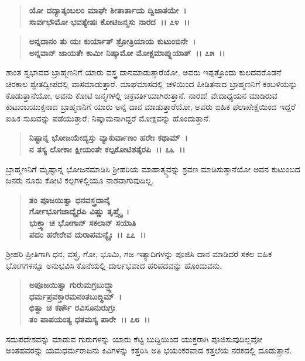 \begin{verse}
\textbf{ಯೋ ದದ್ಯಾತ್ಕಂಬಲಂ ಮಾಘೇ ಶೀತಾರ್ತಾಯ ದ್ವಿಜಾತಯೇ~।}\\\textbf{ಸಾರ್ವಭೌಮೋ ಭವತ್ಯೇಷಃ ಕೋಟಿಜನ್ಮಸು ನಾರದ~।। ೭೪~।।} 
\end{verse}

\begin{verse}
\textbf{ಅನ್ನದಾನಂ ತು ಯಃ ಕುರ್ಯಾತ್ ಶ್ರೋತ್ರಿಯಾಯ ಕುಟುಂಬಿನೇ~।}\\\textbf{ಅನ್ನವಾನ್ ಜಾಯತೇ ಕಾಮೀ ನಿಷ್ಕಾಮೋ ಮೋಕ್ಷಮಾಪ್ನುಯಾತ್~।। ೭೫~।।}
\end{verse}

ಶಾಂತ ಸ್ವಭಾವದ ಬ್ರಾಹ್ಮಣನಿಗೆ ಯಾರು ವಸ್ತ್ರ ದಾನಮಾಡುತ್ತಾರೆಯೋ, ಅವರು ಇಪ್ಪತ್ತೊಂದು ಕುಲದವರೊಡನೆ ಚಿರಕಾಲ ಶ್ವೇತದ್ವೀಪದಲ್ಲಿ ವಾಸಮಾಡುತ್ತಾರೆ. ಮಾಘಮಾಸದಲ್ಲಿ ಚಳಿಯಿಂದ ಪೀಡಿತನಾದ ಬ್ರಾಹ್ಮಣನಿಗೆ ಕಂಬಳಿಯನ್ನು ಕೊಡುತ್ತಾನೆಯೋ, ಅವನು ಕೋಟಿ ಜನ್ಮಗಳಲ್ಲಿ ಚಕ್ರವರ್ತಿಯಾಗಿರುತ್ತಾನೆ. ನಾರದ! ವೇದಾಧ್ಯಯನ ಮಾಡಿರುವ ಕುಟುಂಬಯುಕ್ತನಾದ ಬ್ರಾಹ್ಮಣನಿಗೆ ಯಾರು ಅನ್ನ ದಾನ ಮಾಡುತ್ತಾರೆಯೋ, ಅವರು ಐಹಿಕ ಫಲಾಪೇಕ್ಷೆಯಿಂದ ಇದ್ದರೆ ಐಹಿಕ ಸುಖವನ್ನು ಪಡೆಯುತ್ತಾರೆ; ನಿಷ್ಕಾಮನಾಗಿದ್ದರೆ ಮೋಕ್ಷವನ್ನು ಹೊಂದುತ್ತಾನೆ.

\begin{verse}
\textbf{ನಿಷ್ಟಾನ್ನ ಭೋಜಯೇದ್ಯಸ್ತು ವ್ಯಾಕುರ್ವಾಣಂ ಹರೇಃ ಕಥಾಮ್~।}\\\textbf{ನ ತಸ್ಯ ಲೋಕಾಃ ಕ್ಷೀಯಂತೇ ಕಲ್ಪಕೋಟಿಶತೈರಪಿ~।। ೭೬~।।}
\end{verse}

ಬ್ರಾಹ್ಮಣನಿಗೆ ಮೃಷ್ಟಾನ್ನ ಭೋಜನಮಾಡಿಸಿ ಶ‍್ರೀಹರಿಯ ಮಾಹಾತ್ಮ್ಯವನ್ನು ಶ್ರವಣ ಮಾಡಿಸುತ್ತಾನೆಯೋ ಅವನ ಕುಟುಂಬದ ಜನರು ನೂರು ಕೋಟಿ ಕಲ್ಪಗಳಲ್ಲಿಯೂ ನಾಶವಾಗುವುದಿಲ್ಲ.

\begin{verse}
\textbf{ತಂ ಪೂಜಯಿತ್ವಾ ಧನವಸ್ತ್ರದಾನೈ\enginline{-}}\\\textbf{ರ್ಗೋಭೂಗಜಾದ್ಯೈರಪಿ ವಿಷ್ಣು ತೃಪ್ತ್ಯೈ~। }\\\textbf{ಭುಕ್ತ್ವಾ ಚ ಭೋಗಾನ್ ಸಕಲಾನ್ ಸಯಾತಿ} \\\textbf{ಪದಂ ಹರೇರೇವ ದುರಾಪಮನ್ಯೈಃ~।। ೭೭~।।}
\end{verse}

ಶ‍್ರೀಹರಿ ಪ್ರೀತಿಗಾಗಿ ಧನ, ವಸ್ತ್ರ, ಗೋ, ಭೂಮಿ, ಗಜ ಇತ್ಯಾದಿಗಳನ್ನು ಪೂಜಿಸಿ ದಾನ ಮಾಡಿದರೆ ಸಕಲ ಐಹಿಕ ಭೋಗಗಳನ್ನೂ ಅನುಭವಿಸಿ ಕೊನೆಯಲ್ಲಿ ದುರ್ಲಭವಾದ ಹರಿಪದವನ್ನು ಹೊಂದುವನು.

\begin{verse}
\textbf{ಅಪೂಜಯಿತ್ವಾ ಗುರುಮಗ್ರಬುದ್ಧ್ಯಾ}\\\textbf{ಧರ್ಮಪ್ರವಕ್ತಾರಮನಂತಬುದ್ಧಿಮ್~।}\\\textbf{ಛಿತ್ವಾ ಚ ಕರ್ಣೌ ರವಿಸೂನುರುಗ್ರಃ} \\\textbf{ತಂ ಪಾಪಯಂತ್ಯ ಧತಮಸ್ಯ ಪಾರೇ~।। ೭೮~।।}
\end{verse}

ಸದುಪದೇಶವನ್ನು ಮಾಡುವ ಗುರುಗಳನ್ನು ಯಾರು ಕೆಟ್ಟ ಬುದ್ದಿಯಿಂದ ಯುಕ್ತರಾಗಿ ಪೂಜಿಸುವುದಿಲ್ಲವೋ ಅಂತಹವರನ್ನು ಯಮಧರ್ಮರಾಜನು ಕಿವಿಗಳನ್ನು ಕತ್ತರಿಸಿ ಅತಿ ಭಯಂಕರವಾದ ಕತ್ತಲೆಯ ನರಕದಲ್ಲಿ ದೂಡುತ್ತಾನೆ.

